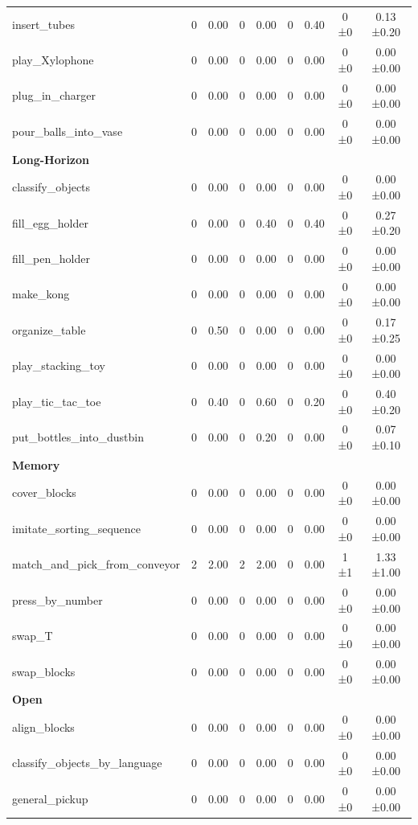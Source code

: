 \begin{table}[H]
{\begin{tabular}{l|c|c|c|c|c|c|c|c}
insert\_tubes & 0 & 0.00 & 0 & 0.00 & 0 & 0.40 & 0 ±0 & 0.13 ±0.20 \\
play\_Xylophone & 0 & 0.00 & 0 & 0.00 & 0 & 0.00 & 0 ±0 & 0.00 ±0.00 \\
plug\_in\_charger & 0 & 0.00 & 0 & 0.00 & 0 & 0.00 & 0 ±0 & 0.00 ±0.00 \\
pour\_balls\_into\_vase & 0 & 0.00 & 0 & 0.00 & 0 & 0.00 & 0 ±0 & 0.00 ±0.00 \\
\hline
\multicolumn{9}{l}{\textbf{Long-Horizon}} \\
classify\_objects & 0 & 0.00 & 0 & 0.00 & 0 & 0.00 & 0 ±0 & 0.00 ±0.00 \\
fill\_egg\_holder & 0 & 0.00 & 0 & 0.40 & 0 & 0.40 & 0 ±0 & 0.27 ±0.20 \\
fill\_pen\_holder & 0 & 0.00 & 0 & 0.00 & 0 & 0.00 & 0 ±0 & 0.00 ±0.00 \\
make\_kong & 0 & 0.00 & 0 & 0.00 & 0 & 0.00 & 0 ±0 & 0.00 ±0.00 \\
organize\_table & 0 & 0.50 & 0 & 0.00 & 0 & 0.00 & 0 ±0 & 0.17 ±0.25 \\
play\_stacking\_toy & 0 & 0.00 & 0 & 0.00 & 0 & 0.00 & 0 ±0 & 0.00 ±0.00 \\
play\_tic\_tac\_toe & 0 & 0.40 & 0 & 0.60 & 0 & 0.20 & 0 ±0 & 0.40 ±0.20 \\
put\_bottles\_into\_dustbin & 0 & 0.00 & 0 & 0.20 & 0 & 0.00 & 0 ±0 & 0.07 ±0.10 \\
\hline
\multicolumn{9}{l}{\textbf{Memory}} \\
cover\_blocks & 0 & 0.00 & 0 & 0.00 & 0 & 0.00 & 0 ±0 & 0.00 ±0.00 \\
imitate\_sorting\_sequence & 0 & 0.00 & 0 & 0.00 & 0 & 0.00 & 0 ±0 & 0.00 ±0.00 \\
match\_and\_pick\_from\_conveyor & 2 & 2.00 & 2 & 2.00 & 0 & 0.00 & 1 ±1 & 1.33 ±1.00 \\
press\_by\_number & 0 & 0.00 & 0 & 0.00 & 0 & 0.00 & 0 ±0 & 0.00 ±0.00 \\
swap\_T & 0 & 0.00 & 0 & 0.00 & 0 & 0.00 & 0 ±0 & 0.00 ±0.00 \\
swap\_blocks & 0 & 0.00 & 0 & 0.00 & 0 & 0.00 & 0 ±0 & 0.00 ±0.00 \\
\hline
\multicolumn{9}{l}{\textbf{Open}} \\
align\_blocks & 0 & 0.00 & 0 & 0.00 & 0 & 0.00 & 0 ±0 & 0.00 ±0.00 \\
classify\_objects\_by\_language & 0 & 0.00 & 0 & 0.00 & 0 & 0.00 & 0 ±0 & 0.00 ±0.00 \\
general\_pickup & 0 & 0.00 & 0 & 0.00 & 0 & 0.00 & 0 ±0 & 0.00 ±0.00 \\

\end{tabular}}
\end{table}
